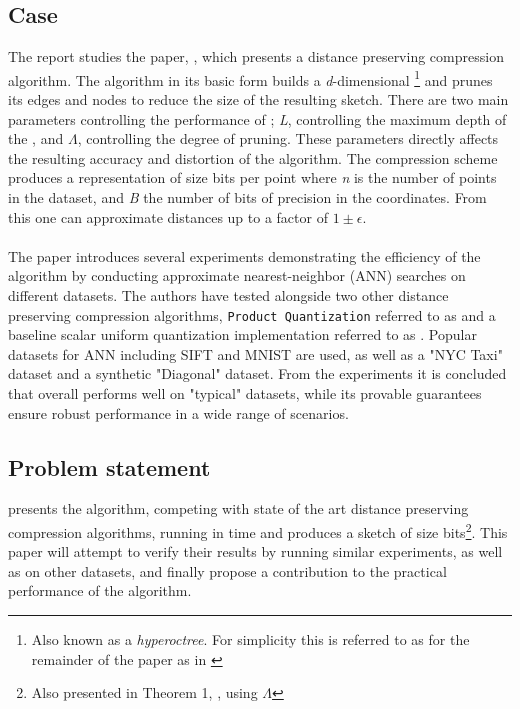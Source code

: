 \subsection{Case} %
The report studies the paper, \cite{wagner17}, which presents a distance preserving compression algorithm. The algorithm in its basic form builds a \textit{d}-dimensional \qt{}\footnote{Also known as a \textit{hyperoctree}. For simplicity this is referred to as \qt{} for the remainder of the paper as in \cite{wagner17}} and prunes its edges and nodes to reduce the size of the resulting sketch. There are two main parameters controlling the performance of \qs{}; \textit{L}, controlling the maximum depth of the \qt{}, and $\Lambda$, controlling the degree of pruning. These parameters directly affects the resulting accuracy and distortion of the algorithm. The compression scheme produces a representation of size  bits per point where \textit{n} is the number of points in the dataset, and \textit{B} the number of bits of precision in the coordinates. From this one can approximate distances up to a factor of $1\pm\epsilon$. 
\\
\\
The paper introduces several experiments demonstrating the efficiency of the algorithm by conducting approximate nearest-neighbor (ANN) searches on different datasets. The authors have tested \qs{} alongside two other distance preserving compression algorithms, \texttt{Product Quantization} referred to as \pq{} and a baseline scalar uniform quantization implementation referred to as \gr{}. Popular datasets for ANN including SIFT and MNIST are used, as well as a "NYC Taxi" dataset and a synthetic "Diagonal" dataset. From the experiments it is concluded that \qs{} overall performs well on "typical" datasets, while its provable guarantees ensure robust performance in a wide range of scenarios\cite[p. 2, l. 38-40]{wagner17}. 

\subsection{Problem statement} %
\label{intro:problemStatement}
\cite{wagner17} presents the \qs{} algorithm, competing with state of the art distance preserving compression algorithms, running in  time and produces a sketch of size  bits\footnote{Also presented in Theorem 1, \cite[p. 3]{wagner17}, using $\Lambda$}. This paper will attempt to verify their results by running similar experiments, as well as on other datasets, and finally propose a contribution to the practical performance of the \qs{} algorithm.



